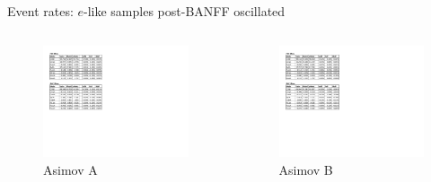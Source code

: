 \documentclass{beamer}
\begin{document}
\begin{frame}{Event rates: $e$-like samples post-BANFF oscillated}
	\centering

	\begin{columns}
		\begin{column}{0.5\paperwidth}
			\begin{figure}
				\includegraphics[page=2, trim={0cm 8cm 13cm 1cm}, clip, scale=0.52] {images/rates/postfit_A}
				\caption*{Asimov A}
			\end{figure}
		\end{column}
		\begin{column}{0.5\paperwidth}
			\begin{figure}
				\includegraphics[page=2, trim={0cm 8cm 13cm 1cm}, clip, scale=0.52] {images/rates/postfit_B}
				\caption*{Asimov B}
			\end{figure}
		\end{column}
	\end{columns}
\end{frame}
\end{document}
